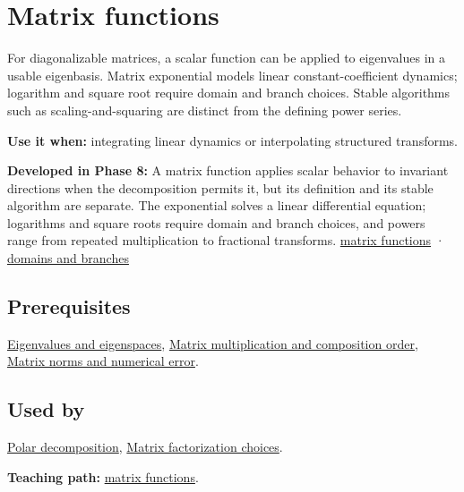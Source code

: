 \hypertarget{appendix-0f4bc2bf2b1f}{}
\section{Matrix functions}\label{appendix-0f4bc2bf2b1f-matrix-functions}

For diagonalizable matrices, a scalar function can be applied to eigenvalues in a usable eigenbasis. Matrix exponential models linear constant-coefficient dynamics; logarithm and square root require domain and branch choices. Stable algorithms such as scaling-and-squaring are distinct from the defining power series.

\textbf{Use it when:} integrating linear dynamics or interpolating structured transforms.

\textbf{Developed in Phase 8:} A matrix function applies scalar behavior to invariant directions when the decomposition permits it, but its definition and its stable algorithm are separate. The exponential solves a linear differential equation; logarithms and square roots require domain and branch choices, and powers range from repeated multiplication to fractional transforms. \hyperref[02-foundations-ii-ch026-matrix-functions-turn-repeated-linear-actions-into-one-operator]{matrix functions} · \hyperref[02-foundations-ii-ch026-logarithms-and-square-roots-need-domains-and-branches]{domains and branches}

\subsection{Prerequisites}\label{appendix-0f4bc2bf2b1f-prerequisites}

\hyperref[appendix-0b3be18411f9]{Eigenvalues and eigenspaces}, \hyperref[appendix-ab31ef447dbf]{Matrix multiplication and composition order}, \hyperref[appendix-f8657bac66e5]{Matrix norms and numerical error}.

\subsection{Used by}\label{appendix-0f4bc2bf2b1f-used-by}

\hyperref[appendix-73f5bcf7a462]{Polar decomposition}, \hyperref[appendix-221a483bec2d]{Matrix factorization choices}.

\textbf{Teaching path:} \hyperref[02-foundations-ii-ch026-matrix-functions-turn-repeated-linear-actions-into-one-operator]{matrix functions}.
